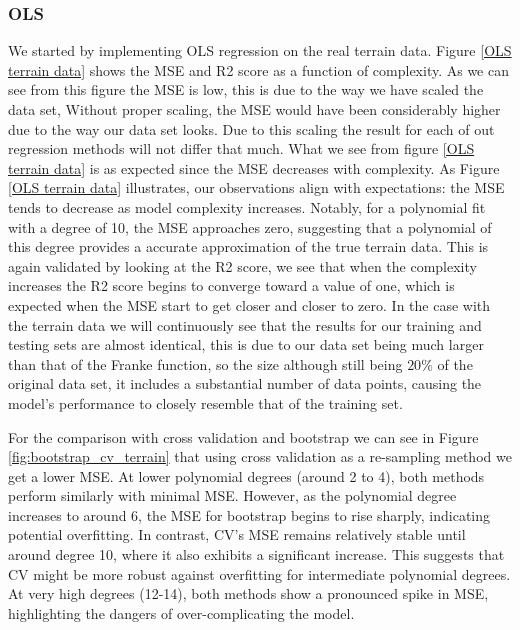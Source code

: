 \subsubsection{OLS}
\noindent We started by implementing OLS regression on the real terrain data. Figure \eqref{OLS terrain data} shows the MSE and R2 score as a function of complexity. As we can see from this figure the MSE is low, this is due to the way we have scaled the data set, Without proper scaling, the MSE would have been considerably higher due to the way our data set looks. Due to this scaling the result for each of out regression methods will not differ that much. What we see from figure \eqref{OLS terrain data} is as expected since the MSE decreases with complexity. As Figure \eqref{OLS terrain data} illustrates, our observations align with expectations: the MSE tends to decrease as model complexity increases. Notably, for a polynomial fit with a degree of 10, the MSE approaches zero, suggesting that a polynomial of this degree provides a accurate approximation of the true terrain data. This is again validated by looking at the R2 score, we see that when the complexity increases the R2 score begins to converge toward a value of one, which is expected when the MSE start to get closer and closer to zero. In the case with the terrain data we will continuously see that the results for our training and testing sets are almost identical, this is due to our data set being much larger than that of the Franke function, so the size although still being $20\%$ of the original data set, it includes a substantial number of data points, causing the model's performance to closely resemble that of the training set. 

For the comparison with cross validation and bootstrap we can see in Figure \eqref{fig:bootstrap_cv_terrain} that using cross validation as a re-sampling method we get a lower MSE. At lower polynomial degrees (around 2 to 4), both methods perform similarly with minimal MSE. However, as the polynomial degree increases to around 6, the MSE for bootstrap begins to rise sharply, indicating potential overfitting. In contrast, CV's MSE remains relatively stable until around degree 10, where it also exhibits a significant increase. This suggests that CV might be more robust against overfitting for intermediate polynomial degrees. At very high degrees (12-14), both methods show a pronounced spike in MSE, highlighting the dangers of over-complicating the model.

